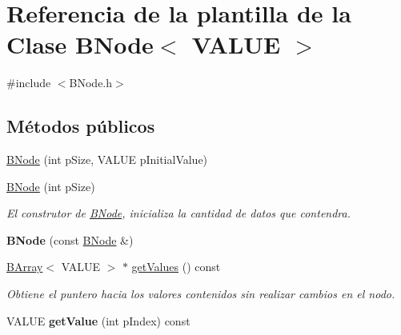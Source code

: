 \hypertarget{classBNode}{\section{Referencia de la plantilla de la Clase B\-Node$<$ V\-A\-L\-U\-E $>$}
\label{classBNode}
}


{\ttfamily \#include $<$B\-Node.\-h$>$}

\subsection*{Métodos públicos}
\begin{DoxyCompactItemize}
\item 
\hyperlink{classBNode_af01747c25c2d2fd3d13e48856b488bc9}{B\-Node} (int p\-Size, V\-A\-L\-U\-E p\-Initial\-Value)
\item 
\hyperlink{classBNode_a75ca826e991a8e57cb67748ab03aea77}{B\-Node} (int p\-Size)
\begin{DoxyCompactList}\small\item\em El construtor de \hyperlink{classBNode}{B\-Node}, inicializa la cantidad de datos que contendra. \end{DoxyCompactList}\item 
\hypertarget{classBNode_aa98b14c2075af9acbd7c3a76ba8f7078}{{\bfseries B\-Node} (const \hyperlink{classBNode}{B\-Node} \&)}\label{classBNode_aa98b14c2075af9acbd7c3a76ba8f7078}

\item 
\hyperlink{classBArray}{B\-Array}$<$ V\-A\-L\-U\-E $>$ $\ast$ \hyperlink{classBNode_a4aa76bfa386186a44a1a136aaf22da9c}{get\-Values} () const 
\begin{DoxyCompactList}\small\item\em Obtiene el puntero hacia los valores contenidos sin realizar cambios en el nodo. \end{DoxyCompactList}\item 
\hypertarget{classBNode_a63d0402efc62f6876d6ec2db7e4d75f8}{V\-A\-L\-U\-E {\bfseries get\-Value} (int p\-Index) const }\label{classBNode_a63d0402efc62f6876d6ec2db7e4d75f8}


\end{DoxyCompactItemize}
